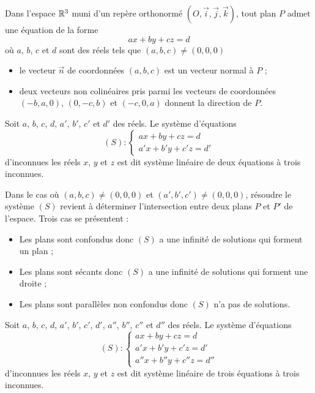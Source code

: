 \begin{defprop}
	Dans l'espace \(\mathbb{R}^3\) muni d’un repère orthonormé \((O,\vec{i},\vec{j},\vec{k})\), tout plan \(P\) admet une équation de la forme
	\[ax + by + cz = d\]
	où \(a\), \(b\), \(c\) et \(d\) sont des réels tels que \((a,b,c)\neq (0,0,0)\)
	\begin{itemize}
		\item le vecteur \(\vec{n}\) de coordonnées \((a,b,c)\) est un vecteur normal à \(P\) ;
		\item deux vecteurs non colinéaires pris parmi les vecteurs de coordonnées \((-b,a,0)\), \((0,-c,b)\) et \((-c,0,a)\) donnent la direction de \(P\).
	\end{itemize}
\end{defprop}

\begin{defprop}
	Soit \(a\), \(b\), \(c\), \(d\), \(a'\), \(b'\), \(c'\) et \(d'\) des réels. Le système d’équations
	\[
		(S) :
		\begin{cases}
			ax + by + cz = d \\
			a'x + b'y + c'z = d'
		\end{cases}
	\]
	d’inconnues les réels \(x\), \(y\) et \(z\) est dit système linéaire de deux équations à trois inconnues.
\end{defprop}

\begin{defprop}
	Dans le cas où \((a,b,c)\neq (0,0,0)\) et \((a',b',c')\neq (0,0,0)\), résoudre le système \((S)\) revient à déterminer l’intersection entre deux plans \(P\) et \(P'\) de l’espace.
	Trois cas se présentent :
	\begin{itemize}
		\item Les plans sont confondus donc \((S)\) a une infinité de solutions qui forment un plan ;
		\item Les plans sont sécants donc \((S)\) a une infinité de solutions qui forment une droite ;
		\item Les plans sont parallèles non confondus donc \((S)\) n’a pas de solutions.
	\end{itemize}
\end{defprop}
\begin{defprop}
	Soit \(a\), \(b\), \(c\), \(d\), \(a'\), \(b'\), \(c'\), \(d'\), \(a''\), \(b''\), \(c''\) et \(d''\) des réels. Le système d’équations
	\[ (S) : \begin{cases}
			ax + by + cz = d     \\
			a'x + b'y + c'z = d' \\
			a''x + b''y + c''z = d''
		\end{cases} \]
	d’inconnues les réels \(x\), \(y\) et \(z\) est dit système linéaire de trois équations à trois inconnues.
\end{defprop}

